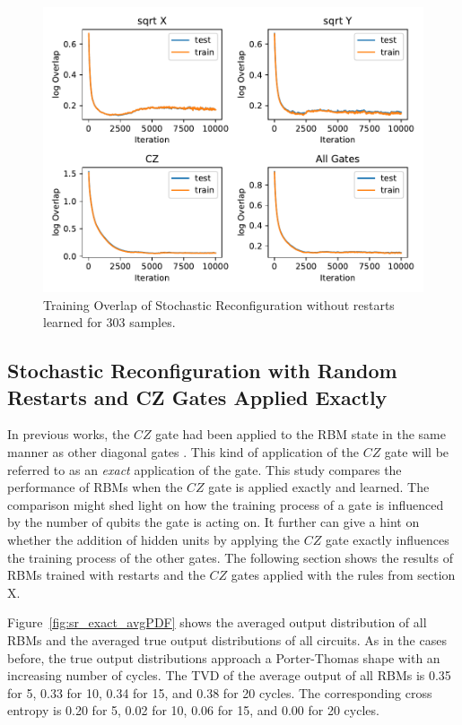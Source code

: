 \begin{figure}[H]
  \centering
  \includegraphics[width=\textwidth]{figures/results/SR-no-restarts-learned/avgOverlap_303.pdf}
  \caption[Training overlap of Stochastic Reconfiguration without restarts learned]{Training 
  Overlap of Stochastic Reconfiguration without restarts learned for 303 samples.}
  \label{fig:sr_no_restarts_overlap_303}
\end{figure}

\newpage

\subsection{Stochastic Reconfiguration with Random Restarts and CZ Gates Applied Exactly}

In previous works, the $CZ$ gate had been applied to the RBM state in the same manner as 
other diagonal gates \cite{jnsson2018neuralnetwork}. This kind of application of the $CZ$ gate 
will be referred to as an \textit{exact} application of the gate. This study compares 
the performance of RBMs when the $CZ$ gate is applied exactly and learned. The comparison might shed
light on how the training process of a gate is influenced by the number of qubits the gate 
is acting on. It further can give a hint on whether the addition of hidden units by applying the $CZ$
gate exactly influences the training process of the other gates.
The following section shows the results of RBMs trained with restarts and the $CZ$ gates applied 
with the rules from section X.

Figure~\ref{fig:sr_exact_avgPDF} shows the averaged output distribution of all RBMs and
the averaged true output distributions of all circuits. As in the cases before, the 
true output distributions approach a Porter-Thomas shape with an increasing number of cycles.
The TVD of the average output of all RBMs 
is 0.35 for 5, 0.33 for 10, 0.34 for 15, and 0.38 for 20 cycles. The corresponding cross entropy is 
0.20 for 5, 0.02 for 10, 0.06 for 15, and 0.00 for 20 cycles.

